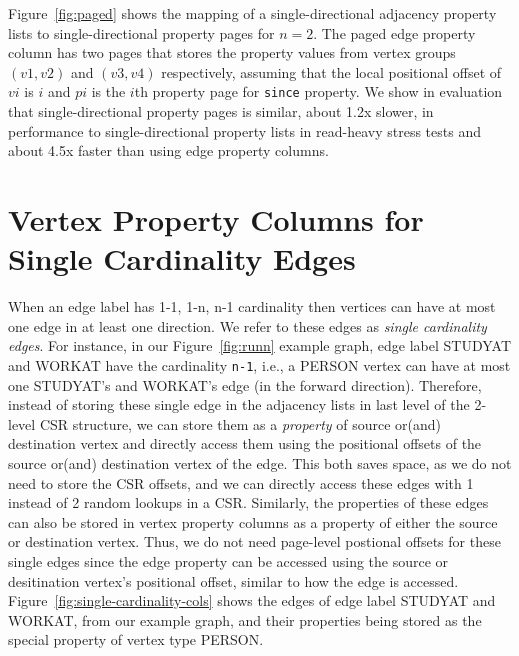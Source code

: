 Figure~\ref{fig:paged} shows the mapping of a single-directional adjacency property lists to single-directional  property pages for $n=2$. The paged edge property column has two pages that stores the property values from vertex groups $(v1,v2)$ and $(v3,v4)$ respectively, assuming that the local positional offset of $vi$ is $i$ and $pi$ is the $i$th property page for \texttt{since} property. 
We show in evaluation that single-directional  property pages is similar, about 1.2x slower, in performance to single-directional property lists in read-heavy stress tests and about 4.5x faster than using edge property columns. 

\section{Vertex Property Columns for Single Cardinality Edges}
\label{sec:single-cardinality-cols}

When an edge label has 1-1, 1-n, n-1 cardinality then vertices can have at most one edge in at least one direction. We refer to these edges as {\em single cardinality edges}. For instance, in our Figure~\ref{fig:runn} example graph, edge label STUDYAT and WORKAT have the cardinality \texttt{n-1}, i.e., a PERSON vertex can have at most one STUDYAT's and WORKAT's edge (in the forward direction). Therefore, instead of storing these single edge in the adjacency lists in last level of the 2-level CSR structure, we can store them as a \emph{property} of source or(and) destination vertex and directly access them using the positional offsets of the source or(and) destination vertex of the edge. This both saves space, as we do not need to store the CSR offsets, and we can directly access these edges with 1 instead of 2 random lookups in a CSR. Similarly, the properties of these edges can also be stored in vertex property columns as a property of either the source or destination vertex. Thus, we do not need page-level postional offsets for these single edges since the edge property can be accessed using the source or desitination vertex's positional offset, similar to how the edge is accessed. Figure~\ref{fig:single-cardinality-cols} shows the edges of edge label STUDYAT and WORKAT, from our example graph, and their properties being stored as the special property of vertex type PERSON.

